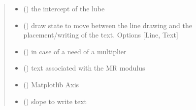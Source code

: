 \documentclass[letterpaper,10pt,english]{sphinxmanual}
\begin{document}
\begin{fulllineitems}
\begin{fulllineitems}
\begin{quote}
\begin{description}
\begin{itemize}
\item {} 
\sphinxAtStartPar
{} () \textendash{} the intercept of the lube

\item {} 
\sphinxAtStartPar
{} () \textendash{} draw state to move between the line drawing and the placement/writing of the text. Options {[}Line, Text{]}

\item {} 
\sphinxAtStartPar
{} () \textendash{} in case of a need of a multiplier

\item {} 
\sphinxAtStartPar
{} () \textendash{} text associated with the MR modulus

\item {} 
\sphinxAtStartPar
{} () \textendash{} Matplotlib Axis

\item {} 
\sphinxAtStartPar
{} () \textendash{} slope to write text

\end{itemize}

\sphinxAtStartPar


\sphinxAtStartPar


\end{description}\end{quote}

\end{fulllineitems}



\end{fulllineitems}
\end{document}
